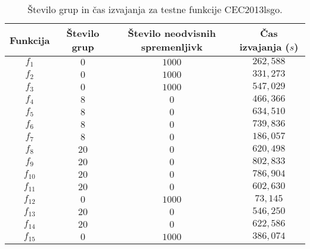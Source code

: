 \begin{table}[t]
    \renewcommand{\arraystretch}{1.3}
    \centering
    \caption{Število grup in čas izvajanja za testne funkcije CEC2013lsgo.} \label{tab:bech:func_basic_stats}
    \begin{tabular}{|c|c|c|c|}
        \hline
        Funkcija & Število grup & Število neodvisnih spremenljivk & Čas izvajanja ($s$) \\\hline
        $f_1$    & $0$  & $1000$ & $262{,}588$ \\\hline
        $f_2$    & $0$  & $1000$ & $331{,}273$ \\\hline
        $f_3$    & $0$  & $1000$ & $547{,}029$ \\\hline
        $f_4$    & $8$  & $0$    & $466{,}366$ \\\hline
        $f_5$    & $8$  & $0$    & $634{,}510$ \\\hline
        $f_6$    & $8$  & $0$    & $739{,}836$ \\\hline
        $f_7$    & $8$  & $0$    & $186{,}057$ \\\hline
        $f_8$    & $20$ & $0$    & $620{,}498$ \\\hline
        $f_9$    & $20$ & $0$    & $802{,}833$ \\\hline
        $f_{10}$ & $20$ & $0$    & $786{,}904$ \\\hline
        $f_{11}$ & $20$ & $0$    & $602{,}630$ \\\hline
        $f_{12}$ & $0$  & $1000$ & $73{,}145$  \\\hline
        $f_{13}$ & $20$ & $0$    & $546{,}250$ \\\hline
        $f_{14}$ & $20$ & $0$    & $622{,}586$ \\\hline
        $f_{15}$ & $0$  & $1000$ & $386{,}074$ \\\hline
    \end{tabular}
\end{table}

